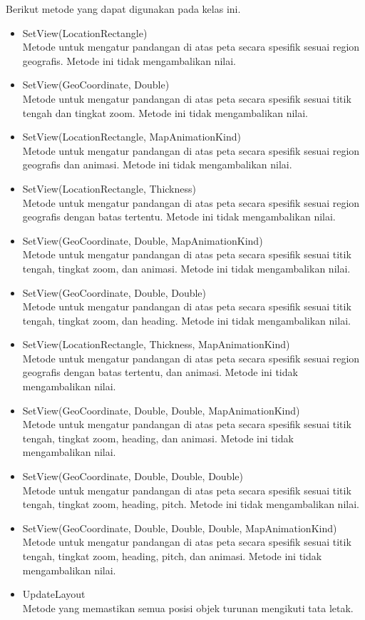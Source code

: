 Berikut metode yang dapat digunakan pada kelas ini.
\begin{itemize}
	\item SetView(LocationRectangle) \\
	Metode untuk mengatur pandangan di atas peta secara spesifik sesuai region geografis. Metode ini tidak mengambalikan nilai.
	\item SetView(GeoCoordinate, Double) \\
	Metode untuk mengatur pandangan di atas peta secara spesifik sesuai titik tengah dan tingkat zoom. Metode ini tidak mengambalikan nilai.
	\item SetView(LocationRectangle, MapAnimationKind)\\
	Metode untuk mengatur pandangan di atas peta secara spesifik sesuai region geografis dan animasi. Metode ini tidak mengambalikan nilai.
	\item 	SetView(LocationRectangle, Thickness) \\
	Metode untuk mengatur pandangan di atas peta secara spesifik sesuai region geografis dengan batas tertentu. Metode ini tidak mengambalikan nilai.
	\item 	SetView(GeoCoordinate, Double, MapAnimationKind) \\
	Metode untuk mengatur pandangan di atas peta secara spesifik sesuai titik tengah, tingkat zoom, dan animasi. Metode ini tidak mengambalikan nilai.
	\item 		SetView(GeoCoordinate, Double, Double) \\
	Metode untuk mengatur pandangan di atas peta secara spesifik sesuai titik tengah, tingkat zoom, dan heading. Metode ini tidak mengambalikan nilai.
	\item 		SetView(LocationRectangle, Thickness, MapAnimationKind) \\
	Metode untuk mengatur pandangan di atas peta secara spesifik sesuai region geografis dengan batas tertentu, dan animasi. Metode ini tidak mengambalikan nilai.
	\item 		SetView(GeoCoordinate, Double, Double, MapAnimationKind) \\
	Metode untuk mengatur pandangan di atas peta secara spesifik sesuai titik tengah, tingkat zoom, heading, dan animasi. Metode ini tidak mengambalikan nilai.	
	\item SetView(GeoCoordinate, Double, Double, Double) \\
	Metode untuk mengatur pandangan di atas peta secara spesifik sesuai titik tengah, tingkat zoom, heading, pitch. Metode ini tidak mengambalikan nilai.
	\item 	SetView(GeoCoordinate, Double, Double, Double, MapAnimationKind) \\
	Metode untuk mengatur pandangan di atas peta secara spesifik sesuai titik tengah, tingkat zoom, heading, pitch, dan animasi. Metode ini tidak mengambalikan nilai.
	\item UpdateLayout \\
	Metode yang memastikan semua posisi objek turunan mengikuti tata letak. 
\end{itemize}

